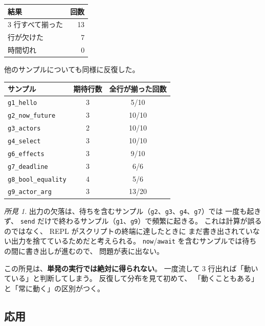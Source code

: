 \documentclass[11pt,a4paper]{ltjsarticle}
\theoremstyle{definition}
\theoremstyle{remark}
\newtheorem{finding}[theorem]{所見}
\begin{document}
\begin{center}
\begin{tabular}{lr}
\toprule
結果 & 回数 \\
\midrule
3 行すべて揃った & 13 \\
行が欠けた       & 7 \\
時間切れ         & 0 \\
\bottomrule
\end{tabular}
\end{center}

他のサンプルについても同様に反復した。

\begin{center}
\begin{tabular}{lcc}
\toprule
サンプル & 期待行数 & 全行が揃った回数 \\
\midrule
\texttt{g1\_hello}        & 3 & 5/10 \\
\texttt{g2\_now\_future}  & 3 & 10/10 \\
\texttt{g3\_actors}       & 2 & 10/10 \\
\texttt{g4\_select}       & 3 & 10/10 \\
\texttt{g6\_effects}      & 3 & 9/10 \\
\texttt{g7\_deadline}     & 3 & 6/6 \\
\texttt{g8\_bool\_equality} & 4 & 5/6 \\
\texttt{g9\_actor\_arg}   & 3 & 13/20 \\
\bottomrule
\end{tabular}
\end{center}

\begin{finding}
出力の欠落は、待ちを含むサンプル（\texttt{g2}、\texttt{g3}、\texttt{g4}、\texttt{g7}）では
一度も起きず、
\texttt{send} だけで終わるサンプル（\texttt{g1}、\texttt{g9}）で頻繁に起きる。
これは計算が誤るのではなく、
REPL がスクリプトの終端に達したときに
まだ書き出されていない出力を捨てているためだと考えられる。
\texttt{now}/\texttt{await} を含むサンプルでは待ちの間に書き出しが進むので、
問題が表に出ない。
\end{finding}

この所見は、\textbf{単発の実行では絶対に得られない}。
一度流して 3 行出れば「動いている」と判断してしまう。
反復して分布を見て初めて、
「動くこともある」と「常に動く」の区別がつく。

\subsection{応用}
\end{document}
